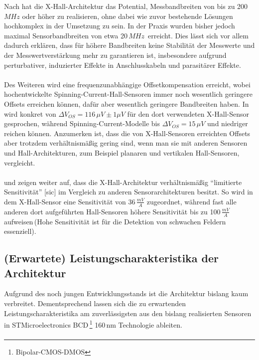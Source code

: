 \documentclass[12pt, a4paper]{article}
\begin{document}
Nach \cite{cres21} hat die X-Hall-Architektur das Potential, Messbandbreiten von bis zu 200\,$MHz$ oder höher zu realisieren, ohne dabei wie zuvor bestehende Lösungen hochkomplex in der Umsetzung zu sein. In der Praxis wurden bisher jedoch maximal Sensorbandbreiten von etwa 20\,$MHz$\,\cite{cres19} erreicht.\newline
Dies lässt sich vor allem dadurch erklären, dass für höhere Bandbreiten keine Stabilität der Messwerte und der Messwertverstärkung mehr zu garantieren ist, insbesondere aufgrund perturbativer, induzierter Effekte in Anschlusskabeln und parasitärer Effekte.\paragraph{}
Des Weiteren wird eine frequenzunabhängige Offsetkompensation erreicht, wobei hochentwickelte Spinning-Current-Hall-Sensoren immer noch wesentlich geringere Offsets erreichen können, dafür aber wesentlich geringere Bandbreiten haben. In \cite{cres22} wird konkret von $\Delta{V_{OS}}=116\,\mu{V}\pm1\mu{V}$ für den dort verwendeten X-Hall-Sensor gesprochen, während Spinning-Current-Modelle bis $\Delta{V_{OS}}=15\,\mu{V}$ und niedriger reichen können. Anzumerken ist, dass die von X-Hall-Sensoren erreichten Offsets aber trotzdem verhältnismäßig gering sind, wenn man sie mit anderen Sensoren und Hall-Architekturen, zum Beispiel planaren und vertikalen Hall-Sensoren, vergleicht.\paragraph{}
\cite{cres22} und \cite{cres23} zeigen weiter auf, dass die X-Hall-Architektur verhältnismäßig ``limitierte Sensitivität'' [sic] im Vergleich zu anderen Sensorarchitekturen besitzt. So wird in \cite{cres21Hall} dem X-Hall-Sensor eine Sensitivität von 36\,$\frac{mV}{A}$ zugeordnet, während fast alle anderen dort aufgeführten Hall-Sensoren höhere Sensitivität bis zu 100\,$\frac{mV}{A}$ aufweisen\,(Hohe Sensitivität ist für die Detektion von schwachen Feldern essenziell). 


\subsection{(Erwartete) Leistungscharakteristika der Architektur}
Aufgrund des noch jungen Entwicklungsstands ist die Architektur bislang kaum verbreitet. Dementsprechend lassen sich die zu erwartenden Leistungscharakteristika am zuverlässigsten aus den bislang realisierten Sensoren in STMicroelectronics BCD\,\footnote{Bipolar-CMOS-DMOS} 160\,nm Technologie ableiten.\paragraph{}
\end{document}
